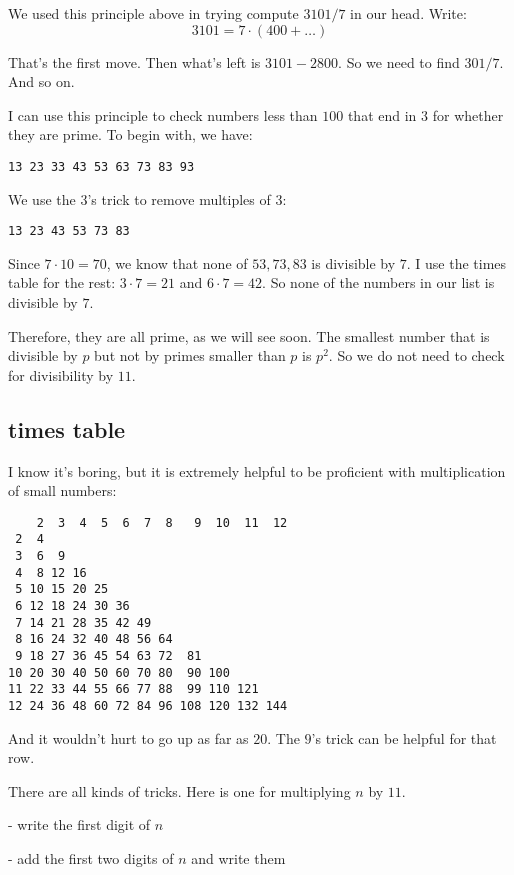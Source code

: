 \documentclass[11pt, oneside]{article}
\begin{document}
We used this principle above in trying compute $3101/7$ in our head.  Write:
\[ 3101 = 7 \cdot (400 + \dots) \]

That's the first move.  Then what's left is $3101 - 2800$.  So we need to find $301/7$.  And so on.

I can use this principle to check numbers less than $100$ that end in $3$ for whether they are prime.  To begin with, we have:

\begin{verbatim}
13 23 33 43 53 63 73 83 93
\end{verbatim}

We use the $3$'s trick to remove multiples of $3$:

\begin{verbatim}
13 23 43 53 73 83
\end{verbatim}

Since $7 \cdot 10 = 70$, we know that none of $53, 73, 83$ is divisible by $7$.  I use the times table for the rest:  $3 \cdot 7 = 21$ and $6 \cdot 7 = 42$.  So none of the numbers in our list is divisible by $7$. 

Therefore, they are all prime, as we will see soon.  The smallest number that is divisible by $p$ but not by primes smaller than $p$ is $p^2$.  So we do not need to check for divisibility by $11$.

\subsection*{times table}

I know it's boring, but it is extremely helpful to be proficient with multiplication of small numbers:

\begin{verbatim}
    2  3  4  5  6  7  8   9  10  11  12
 2  4
 3  6  9
 4  8 12 16
 5 10 15 20 25
 6 12 18 24 30 36
 7 14 21 28 35 42 49
 8 16 24 32 40 48 56 64
 9 18 27 36 45 54 63 72  81
10 20 30 40 50 60 70 80  90 100
11 22 33 44 55 66 77 88  99 110 121
12 24 36 48 60 72 84 96 108 120 132 144
\end{verbatim}

And it wouldn't hurt to go up as far as $20$.  The $9$'s trick can be helpful for that row.

There are all kinds of tricks.  Here is one for multiplying $n$ by $11$.  

- write the first digit of $n$

- add the first two digits of $n$ and write them
\end{document}
